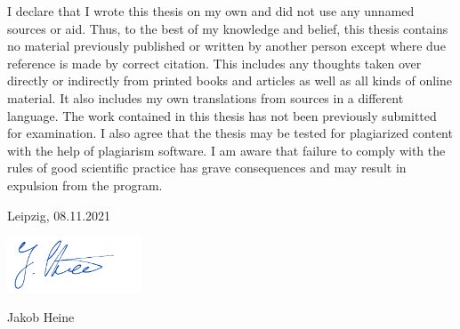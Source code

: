 
I declare that I wrote this thesis on my own and did not use any unnamed sources or aid. Thus, to the best of my knowledge and belief, this thesis contains no material previously published or written by another person except where due reference is made by correct citation. This includes any thoughts taken over directly or indirectly from printed books and articles as well as all kinds of online material. It also includes my own translations from sources in a different language. The work contained in this thesis has not been previously submitted for examination. I also agree that the thesis may be tested for plagiarized content with the help of plagiarism software. I am aware that failure to comply with the rules of good scientific practice has grave consequences and may result in expulsion from the program.


{\parindent0pt

    \vskip 1cm

    Leipzig, 08.11.2021

    \vskip 0.3cm
    
    \includegraphics[width=4cm]{chapter/9_misc/figures/signature.png}

    Jakob Heine
}